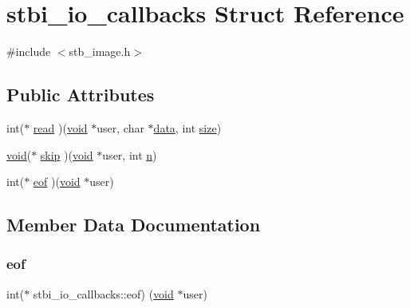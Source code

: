 \hypertarget{structstbi__io__callbacks}{}\section{stbi\+\_\+io\+\_\+callbacks Struct Reference}
\label{structstbi__io__callbacks}


{\ttfamily \#include $<$stb\+\_\+image.\+h$>$}

\subsection*{Public Attributes}
\begin{DoxyCompactItemize}
\item 
int($\ast$ \hyperlink{structstbi__io__callbacks_a623e46b3a2a019611601409926283a88}{read} )(\hyperlink{_s_d_l__opengles2__gl2ext_8h_ae5d8fa23ad07c48bb609509eae494c95}{void} $\ast$user, char $\ast$\hyperlink{_s_d_l__opengl_8h_a2e335d56e2846b0fea47eed068b2d34a}{data}, int \hyperlink{_s_d_l__opengl__glext_8h_a3d1e3edfcf61ca2d831883e1afbad89e}{size})
\item 
\hyperlink{_s_d_l__opengles2__gl2ext_8h_ae5d8fa23ad07c48bb609509eae494c95}{void}($\ast$ \hyperlink{structstbi__io__callbacks_a257aac5480a90a6c4b8fbe86c1b01068}{skip} )(\hyperlink{_s_d_l__opengles2__gl2ext_8h_ae5d8fa23ad07c48bb609509eae494c95}{void} $\ast$user, int \hyperlink{_s_d_l__opengl__glext_8h_ae2b4646468bc89d0ba646f5cf838e051}{n})
\item 
int($\ast$ \hyperlink{structstbi__io__callbacks_a319639db2f76e715eed7a7a974136832}{eof} )(\hyperlink{_s_d_l__opengles2__gl2ext_8h_ae5d8fa23ad07c48bb609509eae494c95}{void} $\ast$user)
\end{DoxyCompactItemize}


\subsection{Member Data Documentation}
\mbox{\label{structstbi__io__callbacks_a319639db2f76e715eed7a7a974136832}} 
\subsubsection{\texorpdfstring{eof}{eof}}
{\footnotesize\ttfamily int($\ast$ stbi\+\_\+io\+\_\+callbacks\+::eof) (\hyperlink{_s_d_l__opengles2__gl2ext_8h_ae5d8fa23ad07c48bb609509eae494c95}{void} $\ast$user)}


